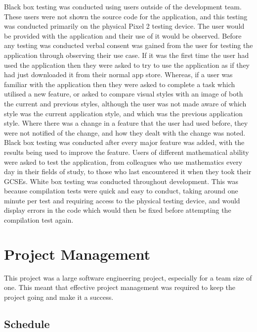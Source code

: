 \documentclass{article}
\begin{document}
Black box testing was conducted using users outside of the development team. These users were not shown the source code for the application, and this testing was conducted primarily on the physical Pixel 2 testing device. The user would be provided with the application and their use of it would be observed. Before any testing was conducted verbal consent was gained from the user for testing the application through observing their use case. If it was the first time the user had used the application then they were asked to try to use the application as if they had just downloaded it from their normal app store. Whereas, if a user was familiar with the application then they were asked to complete a task which utilised a new feature, or asked to compare visual styles with an image of both the current and previous styles, although the user was not made aware of which style was the current application style, and which was the previous application style. Where there was a change in a feature that the user had used before, they were not notified of the change, and how they dealt with the change was noted. \\

Black box testing was conducted after every major feature was added, with the results being used to improve the feature. Users of different mathematical ability were asked to test the application, from colleagues who use mathematics every day in their fields of study, to those who last encountered it when they took their GCSEs. White box testing was conducted throughout development. This was because compilation tests were quick and easy to conduct, taking around one minute per test and requiring access to the physical testing device, and would display errors in the code which would then be fixed before attempting the compilation test again. \\

%
%
%

\section{Project Management}
\label{section:projectManagement}

This project was a large software engineering project, especially for a team size of one. This meant that effective project management was required to keep the project going and make it a success. 

\subsection{Schedule}
\end{document}
